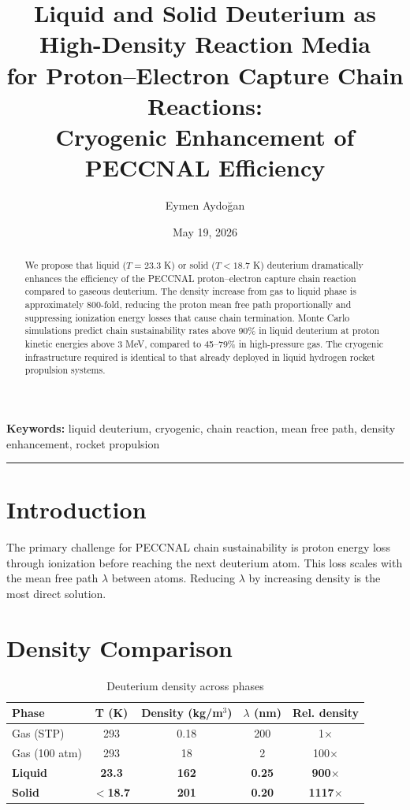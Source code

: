 \documentclass[12pt,a4paper]{article}
\title{\textbf{Liquid and Solid Deuterium as High-Density Reaction Media\\
for Proton--Electron Capture Chain Reactions:\\
Cryogenic Enhancement of PECCNAL Efficiency}}
\author{Eymen Aydoğan}
\date{May 19, 2026}
\begin{document}
\maketitle

\begin{abstract}
We propose that liquid ($T = 23.3$ K) or solid ($T < 18.7$ K)
deuterium dramatically enhances the efficiency of the PECCNAL
proton--electron capture chain reaction compared to gaseous
deuterium. The density increase from gas to liquid phase is
approximately 800-fold, reducing the proton mean free path
proportionally and suppressing ionization energy losses that
cause chain termination. Monte Carlo simulations predict chain
sustainability rates above 90\% in liquid deuterium at proton
kinetic energies above 3 MeV, compared to 45--79\% in high-pressure
gas. The cryogenic infrastructure required is identical to that
already deployed in liquid hydrogen rocket propulsion systems.
\end{abstract}

\noindent\textbf{Keywords:} liquid deuterium, cryogenic, chain reaction,
mean free path, density enhancement, rocket propulsion

\hrule\vspace{1em}

\section{Introduction}
The primary challenge for PECCNAL chain sustainability is proton
energy loss through ionization before reaching the next deuterium
atom. This loss scales with the mean free path $\lambda$ between
atoms. Reducing $\lambda$ by increasing density is the most
direct solution.

\section{Density Comparison}

\begin{table}[h!]
\centering
\caption{Deuterium density across phases}
\vspace{0.5em}
\begin{tabular}{lcccc}
\toprule
\textbf{Phase} & \textbf{T (K)} & \textbf{Density (kg/m$^3$)} & \textbf{$\lambda$ (nm)} & \textbf{Rel. density} \\
\midrule
Gas (STP) & 293 & 0.18 & 200 & 1$\times$ \\
Gas (100 atm) & 293 & 18 & 2 & 100$\times$ \\
\textbf{Liquid} & \textbf{23.3} & \textbf{162} & \textbf{0.25} & \textbf{900$\times$} \\
\textbf{Solid} & \textbf{$<$18.7} & \textbf{201} & \textbf{0.20} & \textbf{1117$\times$} \\
\bottomrule
\end{tabular}
\end{table}
\end{document}
